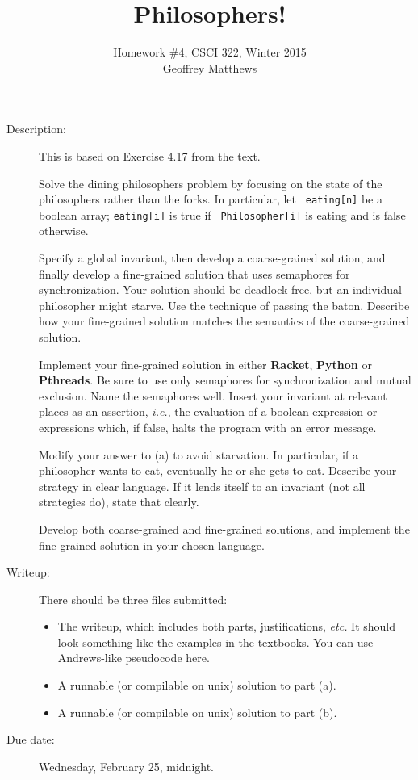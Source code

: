 \documentclass{article}
\title{Philosophers!}
\author{Homework \#4, CSCI 322, Winter 2015\\
Geoffrey Matthews}
\begin{document}
\maketitle
\begin{description}
\item[Description:] This is based on Exercise 4.17 from the text.  

Solve
  the dining philosophers problem by focusing on the state of the
  philosophers rather than the forks.  In particular, let {\tt
    eating[n]} be a boolean array;  {\tt eating[i]} is true if {\tt
    Philosopher[i]} is eating and is false otherwise.

\hspace{-1em}{(a)}  
Specify a global invariant, then develop a coarse-grained
solution, and finally develop a fine-grained solution that uses
semaphores for synchronization.  Your solution should be
deadlock-free, but an individual philosopher might starve.  Use the
technique of passing the baton.  Describe how your fine-grained
solution matches the semantics of the coarse-grained solution.

Implement your fine-grained solution in either {\bf Racket}, {\bf
  Python} or {\bf Pthreads}.  Be sure to use only semaphores for
synchronization and mutual exclusion.  Name the semaphores well.
Insert your invariant at relevant places as an assertion, {\em i.e.},
the evaluation of a boolean expression or expressions which, if false,
halts the program with an error message.

\hspace{-1em}{(b)} Modify your answer to (a) to avoid starvation.  In particular, if
a philosopher wants to eat, eventually he or she gets to eat.
Describe your strategy in clear language.  If it lends itself to an
invariant (not all strategies do), state that clearly.

Develop both coarse-grained and fine-grained solutions, and implement
the fine-grained solution in your chosen language.

  
\item[Writeup:] There should be three files submitted:
\begin{itemize}
\item The writeup, which includes both parts, justifications, {\em
    etc.}  It should look something like the examples in the
  textbooks.  You can use Andrews-like pseudocode here.
\item A runnable (or compilable on unix) solution to part (a).
\item A runnable (or compilable on unix) solution to part (b).
\end{itemize}

\item[Due date:] Wednesday, February 25, midnight.



\end{description}
\end{document}
